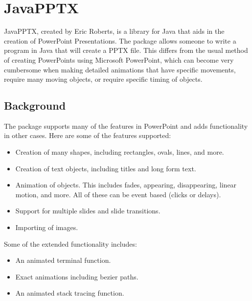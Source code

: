 \documentclass[12pt,twoside]{reedthesis}
\begin{document}
\section{JavaPPTX}
JavaPPTX, created by Eric Roberts, is a library for Java that aids in the creation of PowerPoint Presentations. The package allows someone to write a program in Java that will create a PPTX file. This differs from the usual method of creating PowerPoints using Microsoft PowerPoint, which can become very cumbersome when making detailed animations that have specific movements, require many moving objects, or require specific timing of objects.

\subsection{Background}
The package supports many of the features in PowerPoint and adds functionality in other cases. Here are some of the features supported:
\begin{itemize}
\item Creation of many shapes, including rectangles, ovals, lines, and more. 
\item Creation of text objects, including titles and long form text. 
\item Animation of objects. This includes fades, appearing, disappearing, linear motion, and more. All of these can be event based (clicks or delays). 
\item Support for multiple slides and slide transitions.
\item Importing of images.
\end{itemize}
Some of the extended functionality includes:
\begin{itemize}
\item An animated terminal function.
\item Exact animations including bezier paths. 
\item An animated stack tracing function.
\end{itemize}
\end{document}
